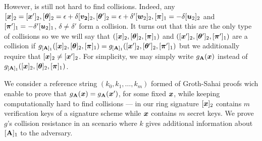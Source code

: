 However, is still not hard to find collisions. Indeed, any $[\vecb{x}]_2=[\vecb{x}']_2,[\vecb{\theta}]_2=\epsilon + \delta[\vecb{v_2}]_2,[\vecb{\theta}']_2 = \epsilon + \delta'[\vecb{w}_2]_2,[\vecb{\pi}]_1 = -\delta[\vec{u}_2]_2$  and $[{\boldsymbol{\pi}}']_1 = -\delta'[{\boldsymbol{u}}_2]_1$, $\delta\neq \delta'$ form a collision. It turns out that this are the only type of collisions so we we will say that $([{\boldsymbol{x}}]_2,[{\boldsymbol{\theta}}]_2,[{\boldsymbol{\pi}}]_1)$ and $([{\boldsymbol{x}}']_2,[{\boldsymbol{\theta}}']_2,[{\boldsymbol{\pi}}']_1)$ are a collision if  $g_{[\mathbf{{A}}]_1}([{\boldsymbol{x}}]_2,[{\boldsymbol{\theta}}]_2,[{\boldsymbol{\pi}}]_1) = g_{[\mathbf{{A}}]_1}([{\boldsymbol{x}}']_2,[{\boldsymbol{\theta}}']_2,[{\boldsymbol{\pi}}']_1)$ but we additionally require that $[{\boldsymbol{x}}]_2\neq[{\boldsymbol{x}}']_2$. For simplicity, we may simply write $g_{\mathbf{{A}}}({\boldsymbol{x}})$ instead of $g_{[\mathbf{{A}}]_1}([{\boldsymbol{x}}]_2,[{\boldsymbol{\theta}}]_2,[{\boldsymbol{\pi}}]_1)$.


We consider a reference string $(k_0,k_1,\ldots,k_m)$ formed of Groth-Sahai proofs wich enable to prove that
 $g_{\mathbf{{A}}}({\boldsymbol{x}}) = g_{\mathbf{{A}}}({\boldsymbol{x}}')$, for some fixed ${\boldsymbol{x}}$, while keeping computationally hard to find collisions --- in our ring signature $[{\boldsymbol{x}}]_2$ contains $m$ verification keys of a signature scheme while ${\boldsymbol{x}}$ contains $m$ secret keys.
We prove $g$'s collision resistance in an scenario where $k$ gives additional information about $[\mathbf{{A}}]_1$ to the adversary.


